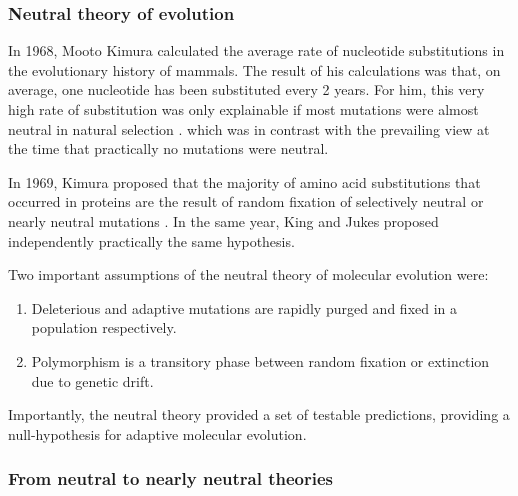 \subsubsection{Neutral theory of evolution}
In 1968, Mooto Kimura calculated the average rate of nucleotide substitutions in the evolutionary history of mammals.
The result of his calculations was that, on average, one nucleotide has been substituted every 2 years.
For him, this very high rate of substitution was only explainable if most mutations were almost neutral in natural selection 
	\citep{Kimura1968}.
which was in contrast with the prevailing view at the time that practically no mutations were neutral.

In 1969, Kimura proposed that the majority of amino acid substitutions that occurred in proteins are the result of random fixation of selectively neutral or nearly neutral mutations  \citep{Kimura1969}. In the same year, King and Jukes \citep{King1969} proposed independently practically the same hypothesis.

Two important assumptions of the neutral theory of molecular evolution were:

\begin{enumerate}
\item Deleterious and adaptive mutations are rapidly purged and fixed in a population respectively.
\item Polymorphism is a transitory phase between random fixation or extinction due to genetic drift.
\end{enumerate}

Importantly, the neutral theory provided a set of testable predictions, providing a null-hypothesis for adaptive molecular evolution.

\subsubsection{From neutral to nearly neutral theories}

